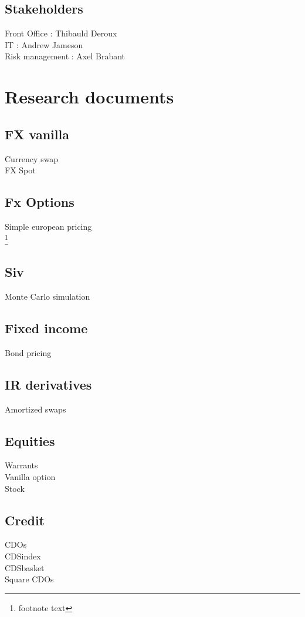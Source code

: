 \documentclass[8pt]{article} %
\begin{document}
\subsection{Stakeholders}
Front Office : Thibauld Deroux\\
IT : Andrew Jameson\\
Risk management : Axel Brabant\\

\section{Research documents}

\subsection{FX vanilla}
Currency swap\\
FX Spot\\

\subsection{Fx Options}
Simple european pricing\\

\footnote{footnote text}

\subsection{Siv}
Monte Carlo simulation\\

\subsection{Fixed income}
Bond pricing\\

\subsection{IR derivatives}
Amortized swaps\\

\subsection{Equities}
Warrants\\
Vanilla option\\
Stock\\

\subsection{Credit}
CDOs\\
CDSindex\\
CDSbasket\\
Square CDOs
\end{document}
